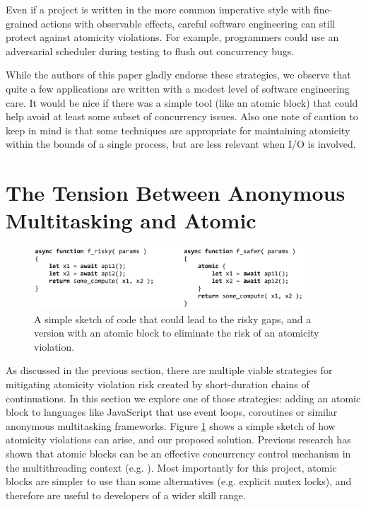 \documentclass[acmsmall,anonymous,review]{acmart}\settopmatter{printfolios=true,printccs=false,printacmref=false}
\begin{document}
Even if a project is written in the more common imperative style with fine-grained actions with observable effects, careful software engineering can still protect against atomicity violations.
For example, programmers could use an adversarial scheduler during testing to flush out concurrency bugs.

While the authors of this paper gladly endorse these strategies, we observe that quite a few applications are written with a modest level of software engineering care.
It would be nice if there was a simple tool (like an atomic block) that could help avoid at least some subset of concurrency issues.
Also one note of caution to keep in mind is that some techniques are appropriate for maintaining atomicity within the bounds of a single process, but are less relevant when I/O is involved.

\section{The Tension Between Anonymous Multitasking and Atomic}

\begin{figure}
\includegraphics[width=0.9\textwidth]{Code/async_atomic_js}
\caption{A simple sketch of code that could lead to the risky gaps, and a version with an atomic block to eliminate the risk of an atomicity violation.}
\label{fig:async_atomic_js}
\end{figure}

As discussed in the previous section, there are multiple viable strategies for mitigating atomicity violation risk created by short-duration chains of continuations.
In this section we explore one of those strategies: adding an atomic block to languages like JavaScript that use event loops, coroutines or similar anonymous multitasking frameworks.
Figure \ref{fig:async_atomic_js} shows a simple sketch of how atomicity violations can arise, and our proposed solution.
Previous research has shown that atomic blocks can be an effective concurrency control mechanism in the multithreading context (e.g. \cite{Pankratius2011, Pankratius2014}).
Most importantly for this project, atomic blocks are simpler to use than some alternatives (e.g. explicit mutex locks), and therefore are useful to developers of a wider skill range\footnotemark{}.
\end{document}
